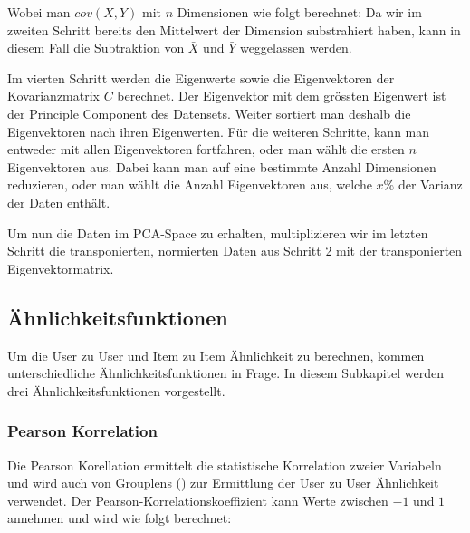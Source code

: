 Wobei man ${cov}(X,Y)$ mit $n$ Dimensionen wie folgt berechnet:
Da wir im zweiten Schritt bereits den Mittelwert der Dimension substrahiert haben, kann in diesem Fall die Subtraktion von $\bar{X}$ und $\bar{Y}$ weggelassen werden.

Im vierten Schritt werden die Eigenwerte sowie die Eigenvektoren der Kovarianzmatrix $C$ berechnet.
Der Eigenvektor mit dem grössten Eigenwert ist der Principle Component des Datensets. Weiter sortiert man deshalb die Eigenvektoren nach ihren Eigenwerten.
Für die weiteren Schritte, kann man entweder mit allen Eigenvektoren fortfahren, oder man wählt die ersten $n$ Eigenvektoren aus. Dabei kann man auf eine bestimmte Anzahl Dimensionen reduzieren, oder man wählt die Anzahl Eigenvektoren aus, welche $x\%$ der Varianz der Daten enthält.

Um nun die Daten im PCA-Space zu erhalten, multiplizieren wir im letzten Schritt die transponierten, normierten Daten aus Schritt 2 mit der transponierten Eigenvektormatrix. 



\subsection{Ähnlichkeitsfunktionen}
Um die User zu User und Item zu Item Ähnlichkeit zu berechnen, kommen unterschiedliche Ähnlichkeitsfunktionen in Frage. In diesem Subkapitel werden drei Ähnlichkeitsfunktionen vorgestellt.

\subsubsection{Pearson Korrelation}
Die Pearson Korellation ermittelt die statistische Korrelation zweier Variabeln und wird auch von Grouplens (\cite{Resnick94grouplens:an}) zur Ermittlung der User zu User Ähnlichkeit verwendet. Der Pearson-Korrelationskoeffizient kann Werte zwischen $-1$ und $1$ annehmen und wird wie folgt berechnet:




